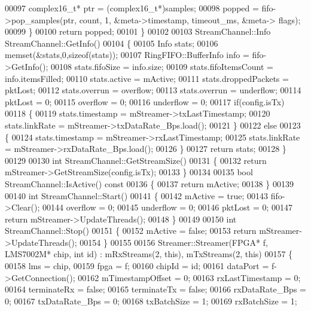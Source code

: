 \begin{DoxyCode}
00097         complex16_t* ptr = (complex16_t*)samples;
00098         popped = fifo->pop_samples(ptr, count, 1, &meta->timestamp, timeout\_ms, &meta->
      flags);
00099     \}
00100     \textcolor{keywordflow}{return} popped;
00101 \}
00102 
00103 StreamChannel::Info StreamChannel::GetInfo()
00104 \{
00105     Info stats;
00106     memset(&stats,0,\textcolor{keyword}{sizeof}(stats));
00107     RingFIFO::BufferInfo info = fifo->GetInfo();
00108     stats.fifoSize = info.size;
00109     stats.fifoItemsCount = info.itemsFilled;
00110     stats.active = mActive;
00111     stats.droppedPackets = pktLost;
00112     stats.overrun = overflow;
00113     stats.overrun = underflow;
00114     pktLost = 0;
00115     overflow = 0;
00116     underflow = 0;
00117     \textcolor{keywordflow}{if}(config.isTx)
00118     \{
00119         stats.timestamp = mStreamer->txLastTimestamp;
00120         stats.linkRate = mStreamer->txDataRate_Bps.load();
00121     \}
00122     \textcolor{keywordflow}{else}
00123     \{
00124         stats.timestamp = mStreamer->rxLastTimestamp;
00125         stats.linkRate = mStreamer->rxDataRate_Bps.load();
00126     \}
00127     \textcolor{keywordflow}{return} stats;
00128 \}
00129 
00130 \textcolor{keywordtype}{int} StreamChannel::GetStreamSize()
00131 \{
00132     \textcolor{keywordflow}{return} mStreamer->GetStreamSize(config.isTx);
00133 \}
00134 
00135 \textcolor{keywordtype}{bool} StreamChannel::IsActive()\textcolor{keyword}{ const}
00136 \textcolor{keyword}{}\{
00137     \textcolor{keywordflow}{return} mActive;
00138 \}
00139 
00140 \textcolor{keywordtype}{int} StreamChannel::Start()
00141 \{
00142     mActive = \textcolor{keyword}{true};
00143     fifo->Clear();
00144     overflow = 0;
00145     underflow = 0;
00146     pktLost = 0;
00147     \textcolor{keywordflow}{return} mStreamer->UpdateThreads();
00148 \}
00149 
00150 \textcolor{keywordtype}{int} StreamChannel::Stop()
00151 \{
00152     mActive = \textcolor{keyword}{false};
00153     \textcolor{keywordflow}{return} mStreamer->UpdateThreads();
00154 \}
00155 
00156 Streamer::Streamer(FPGA* f, LMS7002M* chip, \textcolor{keywordtype}{int} \textcolor{keywordtype}{id}) : mRxStreams(2, this), mTxStreams(2, this)
00157 \{
00158     lms = chip,
00159     fpga = f;
00160     chipId = id;
00161     dataPort = f->GetConnection();
00162     mTimestampOffset = 0;
00163     rxLastTimestamp = 0;
00164     terminateRx = \textcolor{keyword}{false};
00165     terminateTx = \textcolor{keyword}{false};
00166     rxDataRate_Bps = 0;
00167     txDataRate_Bps = 0;
00168     txBatchSize = 1;
00169     rxBatchSize = 1;

\end{DoxyCode}

